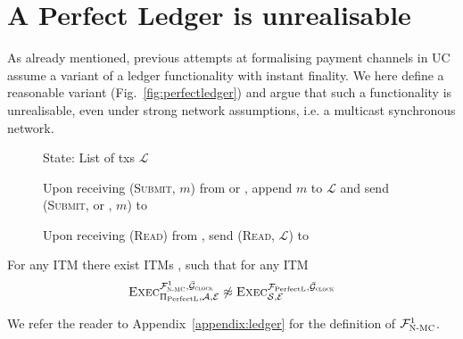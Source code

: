 \section{A Perfect Ledger is unrealisable}
\label{appendix:perfectledger}
  As already mentioned, previous attempts at formalising payment channels in
  UC~\cite{DBLP:conf/ccs/DziembowskiFH18,perun,Malavolta:2017:CPP:3133956.3134096,sprites}
  assume a variant of a ledger functionality with instant finality. We here
  define a reasonable variant \perfectledger{} (Fig.~\ref{fig:perfectledger})
  and argue that such a functionality is unrealisable, even under strong network
  assumptions, i.e. a multicast synchronous network.


  \begin{figure}[H]
    \begin{systembox}{\perfectledger}
      \begin{algorithmic}[1]
        \State State: List of txs $\mathcal{L}$
        \Statex

        \State Upon receiving (\textsc{Submit}, $m$) from \alice or \adversary,
        append $m$ to $\mathcal{L}$ and send (\textsc{Submit}, \alice or
        \adversary, $m$) to \adversary
        \Statex

        \State Upon receiving (\textsc{Read}) from \alice, send (\textsc{Read},
        $\mathcal{L}$) to \alice
      \end{algorithmic}
    \end{systembox}
    \caption{}
    \label{fig:perfectledger:func}
  \end{figure}

  \begin{theorem}
    \label{theorem:perfectledger}
    For any ITM \perfectprot{} there exist ITMs \perfectenv,
    \perfectadv{} such that for any ITM \simulator
    \begin{equation*}
      \textsc{Exec}^{\mathcal{F}_{\textsc{N-MC}}^1, \bar{\mathcal{G}}_{\textsc{clock}}}_{\Pi_{\mathrm{PerfectL}}, \mathcal{A},
      \mathcal{E}} \not\approx \textsc{Exec}^{\mathcal{F}_{\mathrm{PerfectL}},
      \bar{\mathcal{G}}_{\textsc{clock}}}_{\mathcal{S}, \mathcal{E}}
    \end{equation*}
  \end{theorem}

  We refer the reader to Appendix~\ref{appendix:ledger} for the definition of
  $\mathcal{F}_{\textsc{N-MC}}^1$.

